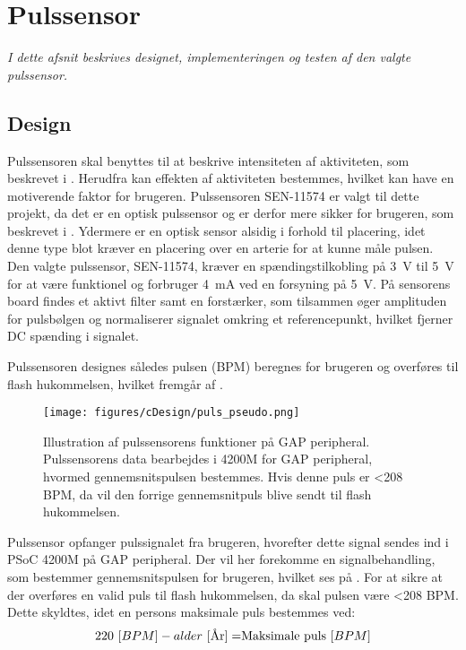 \section{Pulssensor}\label{sec_de_im_te_puls}
\textit{I dette afsnit beskrives designet, implementeringen og testen af den valgte pulssensor.}

\subsection{Design} \label{sec_design_puls}
Pulssensoren skal benyttes til at beskrive intensiteten af aktiviteten, som beskrevet i . Herudfra kan effekten af aktiviteten bestemmes, hvilket kan have en motiverende faktor for brugeren. \newline
Pulssensoren SEN-11574 er valgt til dette projekt, da det er en optisk pulssensor og er derfor mere sikker for brugeren, som beskrevet i . Ydermere er en optisk sensor alsidig i forhold til placering, idet denne type blot kræver en placering over en arterie for at kunne måle pulsen. \newline
Den valgte pulssensor, SEN-11574, kræver en spændingstilkobling på 3~V til 5~V for at være funktionel og forbruger 4~mA ved en forsyning på 5~V. På sensorens board findes et aktivt filter samt en forstærker, som tilsammen øger amplituden for pulsbølgen og normaliserer signalet omkring et referencepunkt, hvilket fjerner DC spænding i signalet. \citep{Murphy2016,Murphy2016_sensor}

Pulssensoren designes således pulsen (BPM) beregnes for brugeren og overføres til flash hukommelsen, hvilket fremgår af .

\begin{figure}[H]
	\centering
	\texttt{[image: figures/cDesign/puls\_pseudo.png]}
	\caption{Illustration af pulssensorens funktioner på GAP peripheral. Pulssensorens data bearbejdes i 4200M for GAP peripheral, hvormed gennemsnitspulsen bestemmes. Hvis denne puls er <208 BPM, da vil den forrige gennemsnitpuls blive sendt til flash hukommelsen.}
	\label{fig:puls_pseudo}
\end{figure}

Pulssensor opfanger pulssignalet fra brugeren, hvorefter dette signal sendes ind i PSoC 4200M på GAP peripheral. Der vil her forekomme en signalbehandling, som bestemmer gennemsnitspulsen for brugeren, hvilket ses på . For at sikre at der overføres en valid puls til flash hukommelsen, da skal pulsen være <208 BPM. Dette skyldtes, idet en persons maksimale puls bestemmes ved: \citep{CooperBlair2005} 
\begin{equation}
220~[BPM] - alder~[$År$] = $Maksimale puls$~[BPM]
\end{equation}

